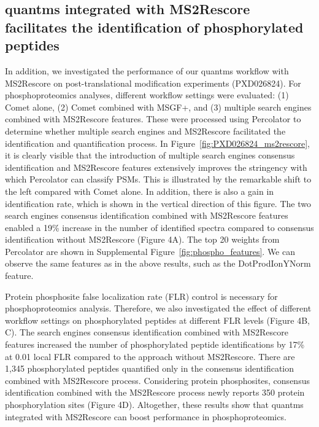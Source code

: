 \documentclass[12pt]{article}
\begin{document}
\subsection{quantms integrated with MS2Rescore facilitates the identification of phosphorylated peptides}
In addition, we investigated the performance of our quantms workflow with MS2Rescore on post-translational modification experiments (PXD026824). For phosphoproteomics analyses, different workflow settings were evaluated: (1) Comet alone, (2) Comet combined with MSGF+, and (3) multiple search engines combined with MS2Rescore features. These were processed using Percolator to determine whether multiple search engines and MS2Rescore facilitated the identification and quantification process. In Figure~\ref{fig:PXD026824_ms2rescore}, it is clearly visible that the introduction of multiple search engines consensus identification and MS2Rescore features extensively improves the stringency with which Percolator can classify PSMs. This is illustrated by the remarkable shift to the left compared with Comet alone. In addition, there is also a gain in identification rate, which is shown in the vertical direction of this figure. The two search engines consensus identification combined with MS2Rescore features enabled a 19\% increase in the number of identified spectra compared to consensus identification without MS2Rescore (Figure 4A). The top 20 weights from Percolator are shown in Supplemental Figure~\ref{fig:phospho_features}. We can observe the same features as in the above results, such as the DotProdIonYNorm feature.

Protein phosphosite false localization rate (FLR) control is necessary for phosphoproteomics analysis. Therefore, we also investigated the effect of different workflow settings on phosphorylated peptides at different FLR levels (Figure 4B, C). The search engines consensus identification combined with MS2Rescore features increased the number of phosphorylated peptide identifications by 17\% at 0.01 local FLR compared to the approach without MS2Rescore. There are 1,345 phosphorylated peptides quantified only in the consensus identification combined with MS2Rescore process. Considering protein phosphosites, consensus identification combined with the MS2Rescore process newly reports 350 protein phosphorylation sites (Figure 4D). Altogether, these results show that quantms integrated with MS2Rescore can boost performance in phosphoproteomics.
\end{document}
